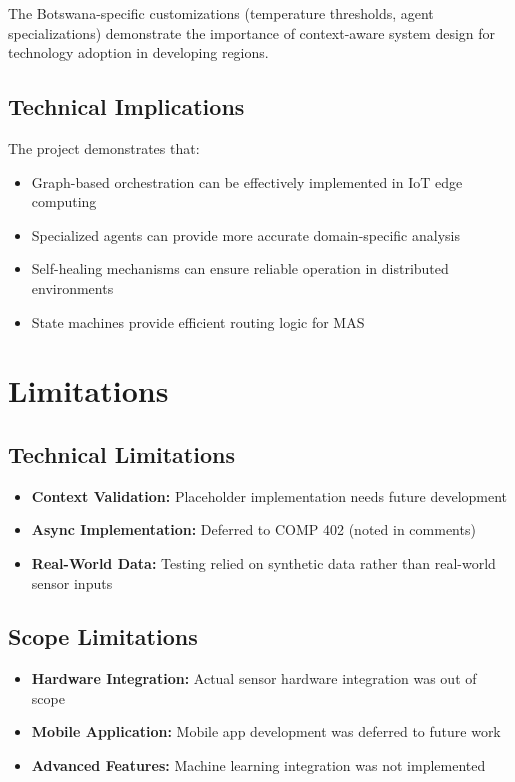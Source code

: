 The Botswana-specific customizations (temperature thresholds, agent specializations) demonstrate the importance of context-aware system design for technology adoption in developing regions.

\subsection{Technical Implications}

The project demonstrates that:

\begin{itemize}
    \item Graph-based orchestration can be effectively implemented in IoT edge computing
    \item Specialized agents can provide more accurate domain-specific analysis
    \item Self-healing mechanisms can ensure reliable operation in distributed environments
    \item State machines provide efficient routing logic for MAS
\end{itemize}

\section{Limitations}

\subsection{Technical Limitations}

\begin{itemize}
    \item \textbf{Context Validation:} Placeholder implementation needs future development
    \item \textbf{Async Implementation:} Deferred to COMP 402 (noted in comments)
    \item \textbf{Real-World Data:} Testing relied on synthetic data rather than real-world sensor inputs
\end{itemize}

\subsection{Scope Limitations}

\begin{itemize}
    \item \textbf{Hardware Integration:} Actual sensor hardware integration was out of scope
    \item \textbf{Mobile Application:} Mobile app development was deferred to future work
    \item \textbf{Advanced Features:} Machine learning integration was not implemented
\end{itemize}

